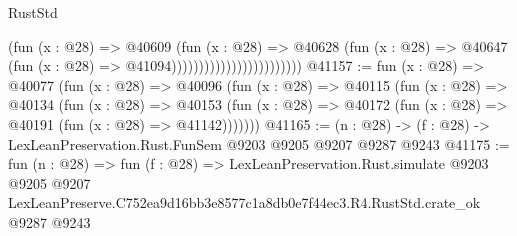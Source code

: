 \begin{lexlean}{RustStd}
\begin{coremodule}
                                            (fun (x : @28) =>
                                            @40609
                                              (fun (x : @28) =>
                                              @40628
                                                (fun (x : @28) =>
                                                @40647
                                                  (fun (x : @28) => @41094))))))))))))))))))))))))
@41157 := fun (x : @28) =>
  @40077
    (fun (x : @28) =>
    @40096
      (fun (x : @28) =>
      @40115
        (fun (x : @28) =>
        @40134
          (fun (x : @28) =>
          @40153 (fun (x : @28) => @40172 (fun (x : @28) => @40191 (fun (x : @28) => @41142)))))))
@41165 := (n : @28) -> (f : @28) -> LexLeanPreservation.Rust.FunSem @9203 @9205 @9207 @9287 @9243
@41175 := fun (n : @28) =>
  fun (f : @28) =>
  LexLeanPreservation.Rust.simulate
    @9203
    @9205
    @9207
    LexLeanPreserve.C752ea9d16bb3e8577c1a8db0e7f44ec3.R4.RustStd.crate_ok
    @9287
    @9243
\end{coremodule}
\end{lexlean}
